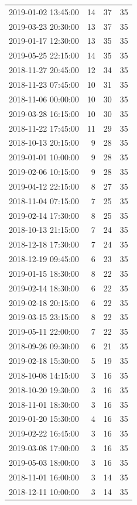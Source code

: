 \begin{tabular}{lrrr}
2019-01-02 13:45:00 & 14 & 37 & 35 \\
2019-03-23 20:30:00 & 13 & 37 & 35 \\
2019-01-17 12:30:00 & 13 & 35 & 35 \\
2019-05-25 22:15:00 & 14 & 35 & 35 \\
2018-11-27 20:45:00 & 12 & 34 & 35 \\
2018-11-23 07:45:00 & 10 & 31 & 35 \\
2018-11-06 00:00:00 & 10 & 30 & 35 \\
2019-03-28 16:15:00 & 10 & 30 & 35 \\
2018-11-22 17:45:00 & 11 & 29 & 35 \\
2018-10-13 20:15:00 & 9 & 28 & 35 \\
2019-01-01 10:00:00 & 9 & 28 & 35 \\
2019-02-06 10:15:00 & 9 & 28 & 35 \\
2019-04-12 22:15:00 & 8 & 27 & 35 \\
2018-11-04 07:15:00 & 7 & 25 & 35 \\
2019-02-14 17:30:00 & 8 & 25 & 35 \\
2018-10-13 21:15:00 & 7 & 24 & 35 \\
2018-12-18 17:30:00 & 7 & 24 & 35 \\
2018-12-19 09:45:00 & 6 & 23 & 35 \\
2019-01-15 18:30:00 & 8 & 22 & 35 \\
2019-02-14 18:30:00 & 6 & 22 & 35 \\
2019-02-18 20:15:00 & 6 & 22 & 35 \\
2019-03-15 23:15:00 & 8 & 22 & 35 \\
2019-05-11 22:00:00 & 7 & 22 & 35 \\
2018-09-26 09:30:00 & 6 & 21 & 35 \\
2019-02-18 15:30:00 & 5 & 19 & 35 \\
2018-10-08 14:15:00 & 3 & 16 & 35 \\
2018-10-20 19:30:00 & 3 & 16 & 35 \\
2018-11-01 18:30:00 & 3 & 16 & 35 \\
2019-01-20 15:30:00 & 4 & 16 & 35 \\
2019-02-22 16:45:00 & 3 & 16 & 35 \\
2019-03-08 17:00:00 & 3 & 16 & 35 \\
2019-05-03 18:00:00 & 3 & 16 & 35 \\
2018-11-01 16:00:00 & 3 & 14 & 35 \\
2018-12-11 10:00:00 & 3 & 14 & 35 \\

\end{tabular}
